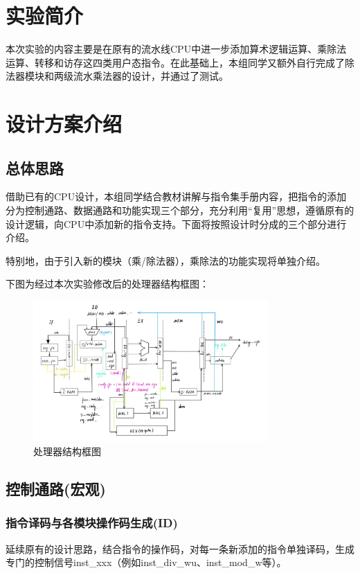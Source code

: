 \documentclass[11pt]{article}
\begin{document}


\section{实验简介}
本次实验的内容主要是在原有的流水线CPU中进一步添加算术逻辑运算、乘除法运算、转移和访存这四类用户态指令。在此基础上，本组同学又额外自行完成了除法器模块和两级流水乘法器的设计，并通过了测试。

\section{设计方案介绍}
\subsection{总体思路}
借助已有的CPU设计，本组同学结合教材讲解与指令集手册内容，把指令的添加分为控制通路、数据通路和功能实现三个部分，充分利用“复用”思想，遵循原有的设计逻辑，向CPU中添加新的指令支持。下面将按照设计时分成的三个部分进行介绍。

特别地，由于引入新的模块（乘/除法器），乘除法的功能实现将单独介绍。

下图为经过本次实验修改后的处理器结构框图：
\begin{figure}[H]
    \centering
    \includegraphics[width=0.8\textwidth]{fig/结构框图.jpg}
    \caption{处理器结构框图}
\end{figure}
\subsection{控制通路(宏观)}

\subsubsection{指令译码与各模块操作码生成(ID)}

延续原有的设计思路，结合指令的操作码，对每一条新添加的指令单独译码，生成专门的控制信号inst_xxx（例如inst_div_wu、inst_mod_w等）。
\end{document}
